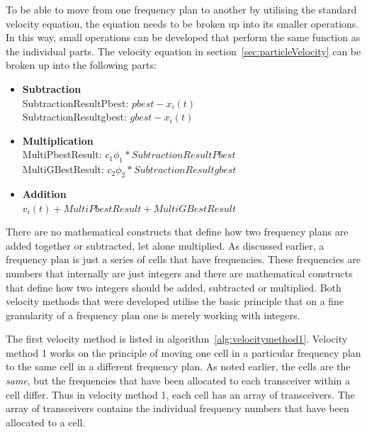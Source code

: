 To be able to move from one frequency plan to another by utilising the standard velocity equation, the equation needs to be broken up into its smaller operations. In this way, small operations can be developed that perform the same function as the individual parts. The velocity equation in section~\ref{sec:particleVelocity} can be broken up into the following parts:
\label{lst:velocitybreakup}
\begin{itemize}
\item \textbf{Subtraction} \\SubtractionResultPbest: $pbest - x_i(t)$\\SubtractionResultgbest: $gbest - x_i(t)$
\\
\item \textbf{Multiplication} \\MultiPbestResult: $c_1\phi_1 * SubtractionResultPbest$\\MultiGBestResult: $c_2\phi_2 * SubtractionResultgbest$ 
\item \textbf{Addition}\\$v_i(t) + MultiPbestResult + MultiGBestResult$
\end{itemize}
There are no mathematical constructs that define how two frequency plans are added together or subtracted, let alone multiplied. As discussed earlier, a frequency plan is just a series of cells that have frequencies. These frequencies are numbers that internally are just integers and there are mathematical constructs that define how two integers should be added, subtracted or multiplied. Both velocity methods that were developed utilise the basic principle that on a fine granularity of a frequency plan one is merely working with integers.


The first velocity method is listed in algorithm~\ref{alg:velocitymethod1}. Velocity method 1 works on the principle of moving one cell in a particular frequency plan to the same cell in a different frequency plan. As noted earlier, the cells are the \emph{same}, but the frequencies that have been allocated to each transceiver within a cell differ. Thus in velocity method 1, each cell has an array of transceivers. The array of transceivers contains the individual frequency numbers that have been allocated to a cell.

